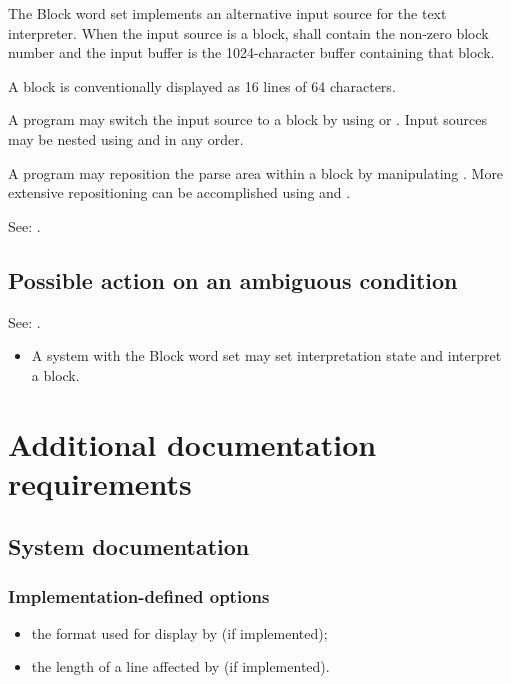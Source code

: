The Block word set implements an alternative input source for the
text interpreter. When the input source is a block,  shall
contain the non-zero block number and the input buffer is the
1024-character buffer containing that block.

A block is conventionally displayed as 16 lines of 64 characters.

A program may switch the input source to a block by using
 or . Input sources may be nested using
 and  in any order.

A program may reposition the parse area within a block by
manipulating . More extensive repositioning can be
accomplished using  and
.

See: .

\subsection{Possible action on an ambiguous condition} %

See: .

\begin{itemize}
\item A system with the Block word set may set interpretation state
	and interpret a block.
\end{itemize}

\section{Additional documentation requirements} %

\subsection{System documentation} %

\subsubsection{Implementation-defined options} %

\begin{itemize}
\item the format used for display by 
	(if implemented);
\item the length of a line affected by 
	(if implemented).
\end{itemize}

